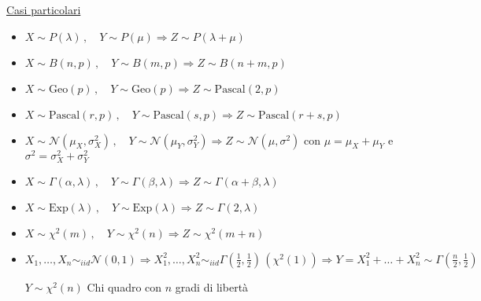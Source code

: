 \documentclass[openany]{book} %
\begin{document}
\underline{Casi particolari}

\begin{itemize}

\item $X\sim P(\lambda)\,,\quad Y\sim P(\mu)\Rightarrow Z\sim P(\lambda + \mu)$

\item $X\sim B(n,p)\,,\quad Y\sim B(m,p)\Rightarrow Z\sim B(n+m,p)$

\item $X\sim \text{Geo}(p)\,,\quad Y\sim \text{Geo}(p)\Rightarrow Z\sim \text{Pascal}(2,p)$

\item $X\sim \text{Pascal}(r,p)\,,\quad Y\sim \text{Pascal}(s,p)\Rightarrow Z\sim \text{Pascal}(r+s,p)$

\item $X\sim \mathcal{N}(\mu_X,\sigma_X^2)\,,\quad Y\sim \mathcal{N}(\mu_Y,\sigma_Y^2)\Rightarrow Z\sim \mathcal{N}(\mu,\sigma^2)$ con $\mu=\mu_X+\mu_Y$ e $\sigma^2=\sigma_X^2+\sigma_Y^2$

\item $X\sim \Gamma(\alpha,\lambda)\,,\quad Y\sim \Gamma(\beta,\lambda)\Rightarrow Z\sim \Gamma(\alpha+\beta,\lambda)$

\item $X\sim \text{Exp}(\lambda)\,,\quad Y\sim \text{Exp}(\lambda)\Rightarrow Z\sim \Gamma(2,\lambda)$

\item $X\sim\chi^2(m)\,,\quad Y\sim\chi^2(n)\Rightarrow Z\sim\chi^2(m+n)$

\item $X_1,\dots, X_n \sim_{iid} \mathcal{N}(0,1)\Rightarrow X_1^2,\dots, X_n^2 \sim_{iid}\Gamma(\frac{1}{2},\frac{1}{2})\,(\chi^2(1))\Rightarrow Y=X_1^2+\dots+X_n^2\sim\Gamma(\frac{n}{2},\frac{1}{2})$ 

$Y\sim\chi^2(n)$ Chi quadro con $n$ gradi di libertà

\end{itemize}
\end{document}
